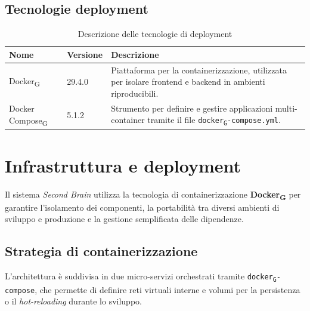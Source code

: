\documentclass[11pt,a4paper]{article}
\newcommand{\gls}[1]{#1\textsubscript{G}}
\begin{document}
\subsection{Tecnologie deployment}
\begin{table}[H]
    \centering
    \begin{tabular}{|p{}|p{}|p{}|}
        \hline
        \textbf{Nome} & \textbf{Versione} & \textbf{Descrizione} \\
        \hline
        \gls{Docker} & 29.4.0 & Piattaforma per la containerizzazione, utilizzata per isolare frontend e backend in ambienti riproducibili. \\
        \hline
        \gls{Docker Compose} & 5.1.2 & Strumento per definire e gestire applicazioni multi-container tramite il file \texttt{\gls{docker}-compose.yml}. \\
        \hline
    \end{tabular}
    \caption{Descrizione delle tecnologie di deployment}
    \label{tab:tecnologie_deployment}
\end{table}

\newpage

\section{Infrastruttura e deployment}
Il sistema \textit{Second Brain} utilizza la tecnologia di containerizzazione \textbf{\gls{Docker}} per garantire l'isolamento dei componenti, la portabilità tra diversi ambienti di sviluppo e produzione e la gestione semplificata delle dipendenze.

\subsection{Strategia di containerizzazione}
L'architettura è suddivisa in due micro-servizi orchestrati tramite \texttt{\gls{docker}-compose}, che permette di definire reti virtuali interne e volumi per la persistenza o il \textit{hot-reloading} durante lo sviluppo.
\end{document}
